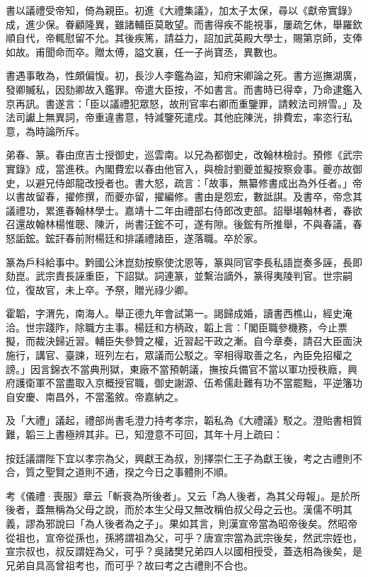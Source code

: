 \begin{pinyinscope}
書以議禮受帝知，倚為親臣。初進《大禮集議》，加太子太保，尋以《獻帝實錄》成，進少保。眷顧隆異，雖諸輔臣莫敢望。而書得疾不能視事，屢疏乞休，舉羅欽順自代，帝輒慰留不允。其後疾篤，請益力，詔加武英殿大學士，賜第京師，支俸如故。甫聞命而卒。贈太傅，謚文襄，任一子尚寶丞，異數也。

書遇事敢為，性頗偏愎。初，長沙人李鑑為盜，知府宋卿論之死。書方巡撫湖廣，發卿贓私，因劾卿故入鑑罪。帝遣大臣按，不如書言。而書時已得幸，乃命逮鑑入京再訊。書遂言：「臣以議禮犯眾怒，故刑官率右卿而重鑒罪，請敕法司辨雪。」及法司讞上無異詞，帝重違書意，特減鑒死遣戍。其他庇陳洸，排費宏，率恣行私意，為時論所斥。

弟春、篆。春由庶吉士授御史，巡雲南。以兄為都御史，改翰林檢討。預修《武宗實錄》成，當進秩。內閣費宏以春由他官入，與檢討劉夔並擬按察僉事。夔亦故御史，以避兄侍郎龍改授者也。書大怒，疏言：「故事，無纂修書成出為外任者。」帝以書故留春，擢修撰，而夔亦留，擢編修。書由是怨宏，數詆諆。及書卒，帝念其議禮功，累進春翰林學士。嘉靖十二年由禮部右侍郎改吏部。詔舉堪翰林者，春欲召還故翰林楊惟聰、陳沂，尚書汪鋐不可，遂有隙。後鋐有所推舉，不與春議，春怒詬鋐。鋐訐春前附楊廷和排議禮諸臣，遂落職。卒於家。

篆為戶科給事中。黔國公沐崑劾按察使沈恩等，篆與同官李長私語崑奏多誣，長即劾崑。武宗責長誣重臣，下詔獄。詞連篆，並繫治謫外，篆得夷陵判官。世宗嗣位，復故官，未上卒。予祭，贈光祿少卿。

霍韜，字渭先，南海人。舉正德九年會試第一。謁歸成婚，讀書西樵山，經史淹洽。世宗踐阼，除職方主事。楊廷和方柄政，韜上言：「閣臣職參機務，今止票擬，而裁決歸近習。輔臣失參贊之權，近習起干政之漸。自今章奏，請召大臣面決施行，講官、臺諫，班列左右，眾議而公駁之。宰相得取善之名，內臣免招權之謗。」因言錦衣不當典刑獄，東廠不當預朝議，撫按兵備官不當以軍功授秩廕，興府護衛軍不當盡取入京概授官職，御史謝源、伍希儒赴難有功不當罷黜，平逆籓功自安慶、南昌外，不當濫敘。帝嘉納之。

及「大禮」議起，禮部尚書毛澄力持考孝宗，韜私為《大禮議》駁之。澄貽書相質難，韜三上書極辨其非。已，知澄意不可回，其年十月上疏曰：

按廷議謂陛下宜以孝宗為父，興獻王為叔，別擇崇仁王子為獻王後，考之古禮則不合，質之聖賢之道則不通，揆之今日之事體則不順。

考《儀禮·喪服》章云「斬衰為所後者」。又云「為人後者，為其父母報」。是於所後者，蓋無稱為父母之說，而於本生父母又無改稱伯叔父母之云也。漢儒不明其義，謬為邪說曰「為人後者為之子」。果如其言，則漢宣帝當為昭帝後矣。然昭帝從祖也，宣帝從孫也，孫將謂祖為父，可乎？唐宣宗當為武宗後矣，然武宗姪也，宣宗叔也，叔反謂姪為父，可乎？吳諸樊兄弟四人以國相授受，蓋迭相為後矣，是兄弟自具高曾祖考也，而可乎？故曰考之古禮則不合也。


\end{pinyinscope}
